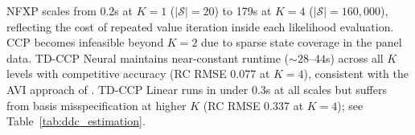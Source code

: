 \begin{table}[t]
\centering
\caption[DDC estimation results across state-space scales]{\textbf{DDC estimation results across state-space scales.} Rows show method, number of components $K$, state-space size $|\mathcal{S}|$, mean wall-clock time (seconds), RC bias, and root mean squared error for each structural parameter. Averages over 5 seeds; dashes indicate method failure (sparse state coverage).}
\label{tab:ddc_estimation}
\small

\end{table}


NFXP scales from 0.2s at $K{=}1$ ($|\mathcal{S}|{=}20$) to 179s at $K{=}4$ ($|\mathcal{S}|{=}160{,}000$), reflecting the cost of repeated value iteration inside each likelihood evaluation. CCP becomes infeasible beyond $K{=}2$ due to sparse state coverage in the panel data. TD-CCP Neural maintains near-constant runtime (${\sim}28$--$44$s) across all $K$ levels with competitive accuracy (RC RMSE 0.077 at $K{=}4$), consistent with the AVI approach of \citet{AdusumilliEckardt2022}. TD-CCP Linear runs in under 0.3s at all scales but suffers from basis misspecification at higher $K$ (RC RMSE 0.337 at $K{=}4$); see Table~\ref{tab:ddc_estimation}.
